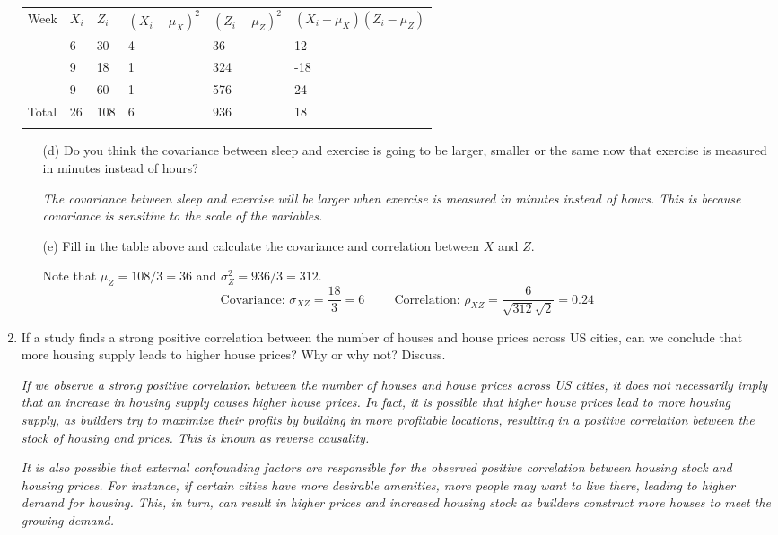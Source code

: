 \documentclass{./../handout}
\begin{document}
\begin{enumerate}
\begin{tabularx}{\textwidth}{P{1cm}P{1cm}P{1.5cm}P{2.5cm}P{2.5cm}Y}
\hline \addlinespace[0.5em]
Week & $X_i$ & $Z_i$ & $(X_i-\mu_X)^2$ & $(Z_i-\mu_Z)^2$ & $(X_i-\mu_X)(Z_i-\mu_Z)$  \\ \addlinespace[0.5em] \hline {} & 6 & 30   	& 4  & 36 & 12  \\ \hline {} & 9 & 18   	& 1  & 324 & -18 \\ \hline {} & 9 & 60   	& 1  & 576 &  24 \\ \hline \addlinespace[0.5em]
Total & 26 & 108 & 6 & 936  & 18 \\ \hline \addlinespace[0.5em]
\end{tabularx}
\begin{enumerate}
\item[(d)] Do you think the covariance between sleep and exercise is going to be larger, smaller or the same now that exercise is measured in minutes instead of hours? 
\item[] \textit{The covariance between sleep and exercise will be larger when exercise is measured in minutes instead of hours. This is because covariance is sensitive to the scale of the variables.}
\item[(e)] Fill in the table above and calculate the covariance and correlation between $X$ and $Z$. \\
\item[] Note that $\mu_Z = 108/3 = 36$ and $\sigma^2_Z = 936/3 = 312.$
$$ \text{Covariance: } \sigma_{XZ} = \frac{18}{3} = 6  \hspace{1cm} \text{Correlation: }\rho_{XZ} = \frac{6}{\sqrt{312} \sqrt{2}}= 0.24 $$
\end{enumerate}
\vspace{4cm}

\item If a study finds a strong positive correlation between the number
of houses and house prices across US cities, can we conclude that
more housing supply leads to higher house prices? Why or why not? Discuss.

\item[] \textit{If we observe a strong positive correlation between the number of houses and house prices across US cities, it does not necessarily imply that an increase in housing supply causes higher house prices. In fact, it is possible that higher house prices lead to more housing supply, as builders try to maximize their profits by building in more profitable locations, resulting in a positive correlation between the stock of housing and prices. This is known as reverse causality.}

\textit{It is also possible that external confounding factors are responsible for the observed positive correlation between housing stock and housing prices. For instance, if certain cities have more desirable amenities, more people may want to live there, leading to higher demand for housing. This, in turn, can result in higher prices and increased housing stock as builders construct more houses to meet the growing demand. }
\end{enumerate}
\end{document}
